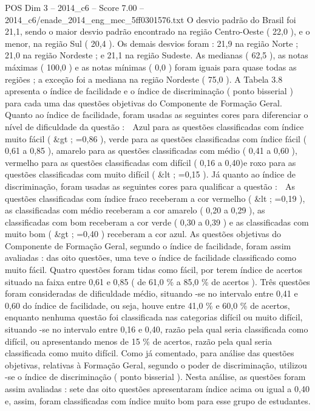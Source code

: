 \begin{textsample}{POS Dim 3 – 2014\_c6 – Score 7.00 – 2014\_c6/enade\_2014\_eng\_mec\_5ff0301576.txt}
O desvio padrão do Brasil foi 21,1, sendo o maior desvio padrão encontrado na região Centro-Oeste ( 22,0 ), e o menor, na região Sul ( 20,4 ).
Os demais desvios foram : 21,9 na região Norte ; 21,0 na região Nordeste ; e 21,1 na região Sudeste.
As medianas ( 62,5 ), as notas máximas ( 100,0 ) e as notas mínimas ( 0,0 ) foram iguais para quase todas as regiões ; a exceção foi a mediana na região Nordeste ( 75,0 ).
A Tabela 3.8 apresenta o índice de facilidade e o índice de discriminação ( ponto bisserial ) para cada uma das questões objetivas do Componente de Formação Geral.
Quanto ao índice de facilidade, foram usadas as seguintes cores para diferenciar o nível de dificuldade da questão :  Azul para as questões classificadas com índice muito fácil ( \&gt ; =0,86 ), verde para as questões classificadas com índice fácil ( 0,61 a 0,85 ), amarelo para as questões classificadas com médio ( 0,41 a 0,60 ), vermelho para as questões classificadas com difícil ( 0,16 a 0,40)e roxo para as questões classificadas com muito difícil ( \&lt ; =0,15 ).
Já quanto ao índice de discriminação, foram usadas as seguintes cores para qualificar a questão :  As questões classificadas com índice fraco receberam a cor vermelho ( \&lt ; =0,19 ), as classificadas com médio receberam a cor amarelo ( 0,20 a 0,29 ), as classificadas com bom receberam a cor verde ( 0,30 a 0,39 ) e as classificadas com muito bom ( \&gt ; =0,40 ) receberam a cor azul.
As questões objetivas do Componente de Formação Geral, segundo o índice de facilidade, foram assim avaliadas : das oito questões, uma teve o índice de facilidade classificado como muito fácil.
Quatro questões foram tidas como fácil, por terem índice de acertos situado na faixa entre 0,61 e 0,85 ( de 61,0 \% a 85,0 \% de acertos ).
Três questões foram consideradas de dificuldade médio, situando -se no intervalo entre 0,41 e 0,60 do índice de facilidade, ou seja, houve entre 41,0 \% e 60,0 \% de acertos, enquanto nenhuma questão foi classificada nas categorias difícil ou muito difícil, situando -se no intervalo entre 0,16 e 0,40, razão pela qual seria classificada como difícil, ou apresentando menos de 15 \% de acertos, razão pela qual seria classificada como muito difícil.
Como já comentado, para análise das questões objetivas, relativas à Formação Geral, segundo o poder de discriminação, utilizou -se o índice de discriminação ( ponto bisserial ).
Nesta análise, as questões foram assim avaliadas : sete das oito questões apresentaram índice acima ou igual a 0,40 e, assim, foram classificadas com índice muito bom para esse grupo de estudantes.

\end{textsample}
